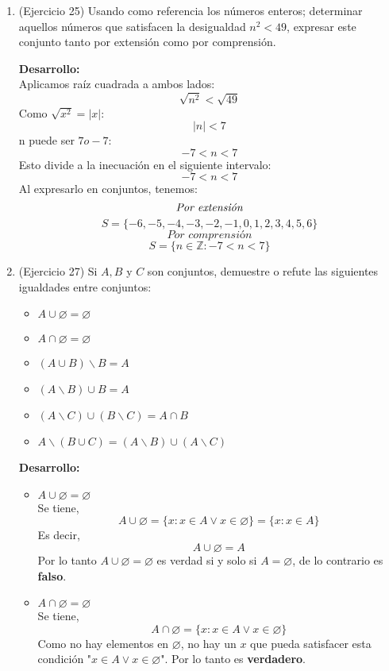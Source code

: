 \documentclass{article}
\theoremstyle{definition}
\begin{document}
\begin{enumerate}
  {\centering \textbf{Desarrollo:}\\}
  \textit{Demostrar por contradicción}\\
  Supongamos lo contrario, la suma de un número racional con un número irracional, es un número racional.\\
  \textit Tenemos un racional $a$ y un irracional $b$, $a+b=p$ (un número racional) para algún $p\in\mathbb{Z}$. Entonces $b=a-p$ como a y p son racionales, b tiene que ser racional $(\rightarrow\leftarrow)$.  \\

 \item (Ejercicio 25) Usando como referencia los números enteros; determinar aquellos números que satisfacen la desigualdad $n^{2}<49$, expresar este conjunto tanto por extensión como por comprensión.
 
 {\centering \textbf{Desarrollo:}\\}
  Aplicamos raíz cuadrada a ambos lados:
  $$\sqrt{n^{2}}<\sqrt{49}$$
  Como $\sqrt{x^{2}}=|x|$:
  $$|n|<7$$
  n puede ser $7 o -7$:
  $$-7<n<7$$
  Esto divide a la inecuación en el siguiente intervalo:
  $$-7<n<7$$
  Al expresarlo en conjuntos, tenemos: 
  $$\textit{Por extensión}\\$$
  $$S=\{-6,-5,-4,-3,-2,-1,0,1,2,3,4,5,6\}$$
  $$\textit{Por comprensión}$$
  $$S=\{n\in\mathbb{Z}: -7 < n < 7\}$$

  \item (Ejercicio 27) Si $A, B$ y $C$ son conjuntos, demuestre o refute las siguientes igualdades entre conjuntos:
  \begin{multicols}{2}
    \begin{itemize}
        \item $A\cup\varnothing=\varnothing$
        \item $A\cap\varnothing=\varnothing$
        \item $(A\cup B)\smallsetminus B = A$
        \item $(A\smallsetminus B)\cup B = A$
        \item $(A\smallsetminus C)\cup(B\smallsetminus C)=A\cap B$
        \item $A\smallsetminus(B\cup C)=(A\smallsetminus B)\cup(A\smallsetminus C)$
    \end{itemize}
  \end{multicols}
  {\centering \textbf{Desarrollo:}\\}
  \begin{itemize}
      \item $A\cup\varnothing=\varnothing$\\
      Se tiene,
      $$A\cup\varnothing=\{x: x\in A \lor x\in\varnothing\}=\{x:x\in A\}$$
      Es decir,
      $$A\cup\varnothing=A$$
      Por lo tanto $A\cup\varnothing=\varnothing$ es verdad si y solo si $A=\varnothing$, de lo contrario es \textbf{falso}.
       \item $A\cap\varnothing=\varnothing$\\
      Se tiene,
      $$A\cap\varnothing=\{x: x\in A \lor x\in\varnothing\}$$
      Como no hay elementos en $\varnothing$, no hay un $x$ que pueda satisfacer esta condición "$x\in A \lor x\in\varnothing$". Por lo tanto es \textbf{verdadero}.
      

\end{itemize}
\end{enumerate}
\end{document}
